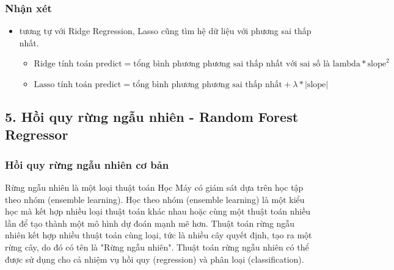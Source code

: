 \documentclass{article}
\begin{document}
	\subsubsection{Nhận xét}
	\begin{itemize}
		\item  tương tự với Ridge Regression, Lasso cũng tìm hệ dữ liệu với phương sai thấp nhất.
		\begin{itemize}
			\item $\text{Ridge tính toán predict} = \text{tổng bình phương phương sai thấp nhất với sai số là lambda} * \text{slope}^2$
			\item $\text{Lasso tính toán predict} = \text{tổng bình phương phương sai thấp nhất} + \lambda * \text{|slope|}$
		\end{itemize}
	\end{itemize}
	\subsection{5. Hồi quy rừng ngẫu nhiên - Random Forest Regressor}
	\subsubsection{Hồi quy rừng ngẫu nhiên cơ bản}
	\qquad Rừng ngẫu nhiên là một loại thuật toán Học Máy có giám sát dựa trên học tập theo nhóm (ensemble learning). Học theo nhóm (ensemble learning) là một kiểu học mà kết hợp nhiều loại thuật toán khác nhau hoặc cùng một thuật toán nhiều lần để tạo thành một mô hình dự đoán mạnh mẽ hơn. Thuật toán rừng ngẫu nhiên kết hợp nhiều thuật toán cùng loại, tức là nhiều cây quyết định, tạo ra một rừng cây, do đó có tên là "Rừng ngẫu nhiên". Thuật toán rừng ngẫu nhiên có thể được sử dụng cho cả nhiệm vụ hồi quy (regression) và phân loại (classification).
	
\end{document}
